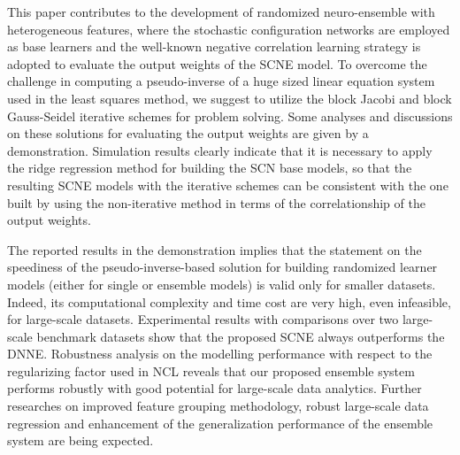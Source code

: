 \documentclass{article}
\begin{document}
This paper contributes to the development of randomized neuro-ensemble with heterogeneous features, where the stochastic configuration networks are employed as base learners and the well-known negative correlation learning strategy is adopted to evaluate the output weights of the SCNE model. To overcome the challenge in computing a pseudo-inverse of a huge sized linear equation system used in the least squares method, we suggest to utilize the block Jacobi and block Gauss-Seidel iterative schemes for problem solving. Some analyses and discussions on these solutions for evaluating the output weights are given by a demonstration. Simulation results clearly indicate that it is necessary to apply the ridge regression method for building the SCN base models, so that the resulting SCNE models with the iterative schemes can be consistent with the one built by using the non-iterative method in terms of the correlationship of the output weights. 

The reported results in the demonstration implies  that the statement on the speediness of the pseudo-inverse-based solution for building randomized learner models (either for single or ensemble models) is valid only for smaller datasets. Indeed, its computational complexity and time cost are very high, even infeasible, for large-scale datasets.  Experimental results with comparisons over two large-scale benchmark datasets show that the proposed SCNE always outperforms the DNNE. Robustness analysis on the modelling performance with respect to the regularizing factor used in NCL reveals that our proposed ensemble system performs robustly with  good potential for large-scale data analytics. 
Further researches on improved feature grouping methodology, robust large-scale data regression \cite{WangandLi_RSCN} and enhancement of the generalization performance of the ensemble system are being expected.
\end{document}
